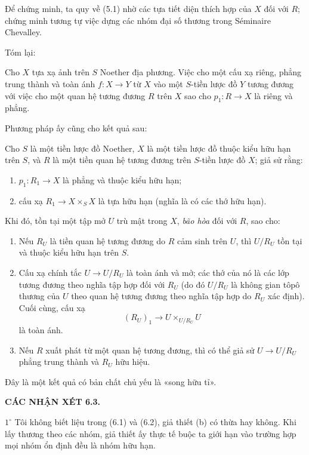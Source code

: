 Để chứng minh, ta quy về (5.1) nhờ các tựa tiết diện thích hợp của $X$ đối với
$R$; chứng minh tương tự việc dựng các nhóm đại số thương trong Séminaire
Chevalley.

Tóm lại:

 Cho $X$ tựa xạ ảnh trên $S$ Noether địa phương. Việc cho
một cấu xạ riêng, phẳng trung thành và toàn ánh $f:X\to Y$ từ $X$ vào một
$S$-tiền lược đồ $Y$ tương đương với việc cho một quan hệ tương đương $R$ trên
$X$ sao cho $p_1:R\to X$ là riêng và phẳng.

Phương pháp ấy cũng cho kết quả sau:

 Cho $S$ là một tiền lược đồ Noether, $X$ là một tiền
lược đồ thuộc kiểu hữu hạn trên $S$, và $R$ là một tiền quan hệ tương đương trên
$S$-tiền lược đồ $X$; giả sử rằng:
\begin{enumerate}
\item[(a)] $p_1:R_1\to X$ là phẳng và thuộc kiểu hữu hạn;
\item[(b)] cấu xạ $R_1\to X\times_S X$ là tựa hữu hạn (nghĩa là có các thớ
hữu hạn).
\end{enumerate}
Khi đó, tồn tại một tập mở $U$ trù mật trong $X$, \emph{bão hòa} đối với $R$,
sao cho:
\begin{enumerate}
\item[(i)] Nếu $R_U$ là tiền quan hệ tương đương do $R$ cảm sinh trên $U$,
thì $U/R_U$ tồn tại và thuộc kiểu hữu hạn trên $S$.

\item[(ii)] Cấu xạ chính tắc $U\to U/R_U$ là toàn ánh và mở; các thớ của nó
là các lớp tương đương theo nghĩa tập hợp đối với $R_U$ (do đó $U/R_U$ là
không gian tôpô thương của $U$ theo quan hệ tương đương theo nghĩa tập hợp do
$R_U$ xác định). Cuối cùng, cấu xạ
\[
  (R_U)_1\longrightarrow U\times_{U/R_U}U
\]
là toàn ánh.

\item[(iii)] Nếu $R$ xuất phát từ một quan hệ tương đương, thì có thể giả sử
$U\to U/R_U$ phẳng trung thành và $R_U$ hữu hiệu.
\end{enumerate}

Đây là một kết quả có bản chất chủ yếu là «song hữu tỉ».

\medskip
\noindent\textbf{CÁC NHẬN XÉT 6.3.}

\smallskip
\noindent $1^\circ$ Tôi không biết liệu trong (6.1) và (6.2), giả thiết (b) có
thừa hay không. Khi lấy thương theo các nhóm, giả thiết ấy thực tế buộc ta
giới hạn vào trường hợp mọi nhóm ổn định đều là nhóm hữu hạn.

